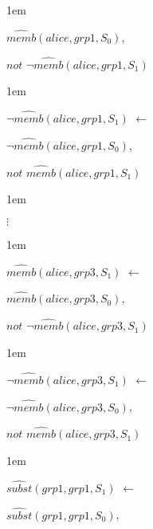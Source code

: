 \documentclass[global,twocolumn,final]{svjour}
\newenvironment{vquote}
  {\begin{list}{}{\leftmargin 1em}\item[]}
  {\end{list}}
\begin{document}
\begin{enumerate}
\begin{vquote}
           \hspace{1em}
           $\hat{memb}(alice, grp1, S_{0})$,

           \hspace{1em}
           $not$ $\lnot\hat{memb}(alice, grp1, S_{1})$
         \end{vquote}

         \begin{vquote}
           $\lnot \hat{memb}(alice, grp1, S_{1})$ $\leftarrow$

           \hspace{1em}
           $\lnot\hat{memb}(alice, grp1, S_{0})$,

           \hspace{1em}
           $not$ $\hat{memb}(alice, grp1, S_{1})$
         \end{vquote}

         \begin{vquote}
           \hspace{2em}$\vdots$
         \end{vquote}

         \begin{vquote}
           $\hat{memb}(alice, grp3, S_{1})$ $\leftarrow$

           \hspace{1em}
           $\hat{memb}(alice, grp3, S_{0})$,

           \hspace{1em}
           $not$ $\lnot\hat{memb}(alice, grp3, S_{1})$
         \end{vquote}

         \begin{vquote}
           $\lnot\hat{memb}(alice, grp3, S_{1})$ $\leftarrow$

           \hspace{1em}
           $\lnot\hat{memb}(alice, grp3, S_{0})$,

           \hspace{1em}
           $not$ $\hat{memb}(alice, grp3, S_{1})$
         \end{vquote}

         \begin{vquote}
           $\hat{subst}(grp1, grp1, S_{1})$ $\leftarrow$

           \hspace{1em}
           $\hat{subst}(grp1, grp1, S_{0})$,


\end{vquote}
\end{enumerate}
\end{document}
